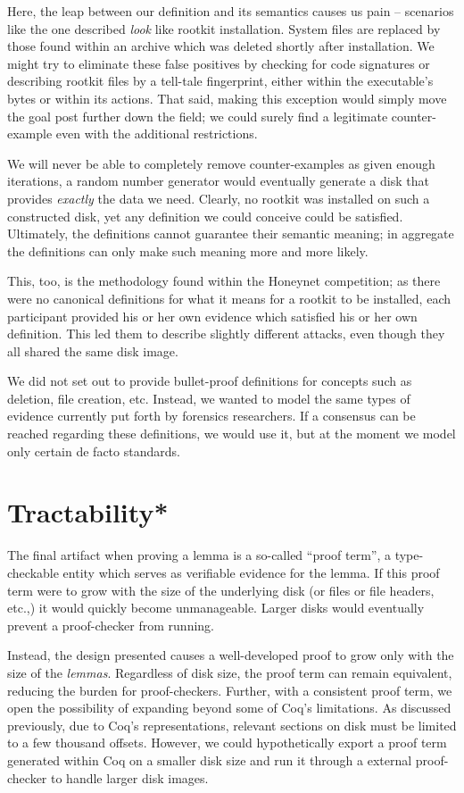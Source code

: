 \documentclass[nocopyrightspace]{sigplanconf}
\begin{document}
Here, the leap between our definition and its semantics causes us pain --
scenarios like the one described {\em look} like rootkit installation. System
files are replaced by those found within an archive which was deleted shortly
after installation. We might try to eliminate these false positives by
checking for code signatures or describing rootkit files by a tell-tale
fingerprint, either within the executable's bytes or within its actions. That
said, making this exception would simply move the goal post further down the
field; we could surely find a legitimate counter-example even with the
additional restrictions.

We will never be able to completely remove counter-examples as given enough
iterations, a random number generator would eventually generate a disk that
provides {\em exactly} the data we need. Clearly, no rootkit was installed on
such a constructed disk, yet any definition we could conceive could be
satisfied. Ultimately, the definitions cannot guarantee their semantic
meaning; in aggregate the definitions can only make such meaning more and more
likely.

This, too, is the methodology found within the Honeynet competition; as there
were no canonical definitions for what it means for a rootkit to be installed,
each participant provided his or her own evidence which satisfied his or her
own definition. This led them to describe slightly different attacks, even
though they all shared the same disk image.

We did not set out to provide bullet-proof definitions for concepts such as
deletion, file creation, etc. Instead, we wanted to model the same types of
evidence currently put forth by forensics researchers. If a consensus can be
reached regarding these definitions, we would use it, but at the moment we
model only certain de facto standards.

\section{Tractability*}
The final artifact when proving a lemma is a so-called ``proof term'', a
type-checkable entity which serves as verifiable evidence for the lemma. If
this proof term were to grow with the size of the underlying disk (or files or
file headers, etc.,) it would quickly become unmanageable. Larger disks would
eventually prevent a proof-checker from running.

Instead, the design presented causes a well-developed proof to grow only with
the size of the {\em lemmas}. Regardless of disk size, the proof term can
remain equivalent, reducing the burden for proof-checkers. Further, with a
consistent proof term, we open the possibility of expanding beyond some of
Coq's limitations. As discussed previously, due to Coq's representations,
relevant sections on disk must be limited to a few thousand offsets. However,
we could hypothetically export a proof term generated within Coq on a smaller
disk size and run it through a external proof-checker to handle larger disk
images.
\end{document}
